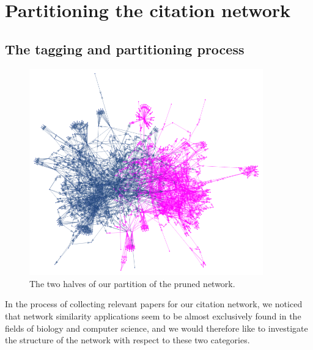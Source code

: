 \documentclass[12pt]{thesis}
\theoremstyle{plain}
\theoremstyle{definition}
\theoremstyle{remark}
\begin{document}









\chapter{Partitioning the citation network}\label{chapter:partitioning}

\section{The tagging and partitioning process}

\begin{figure}[h]
\centering
\includegraphics[width=0.9\textwidth]{subnetwork_partition.png}
\caption{The two halves of our partition of the pruned network.}
\label{fig:partitioned_network}
\end{figure}

In the process of collecting relevant papers for our citation network, we noticed that network similarity applications seem to be almost exclusively found in the fields of biology and computer science, and we would therefore like to investigate the structure of the network with respect to these two categories. 

\end{document}
